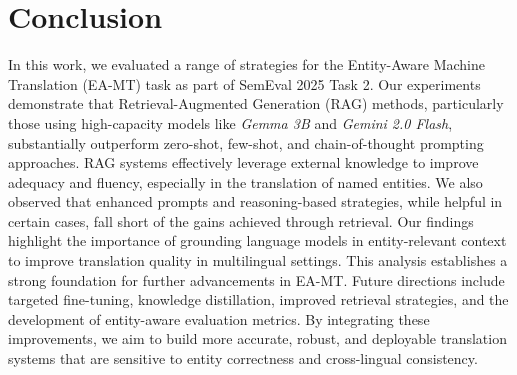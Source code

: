 \documentclass{ecai}
\begin{document}
\section{Conclusion}
\label{sec:conclusion}
In this work, we evaluated a range of strategies for the Entity-Aware Machine Translation (EA-MT) 
task as part of SemEval 2025 Task 2. Our experiments demonstrate that Retrieval-Augmented 
Generation (RAG) methods, particularly those using high-capacity models like \textit{Gemma 3B} 
and \textit{Gemini 2.0 Flash}, substantially outperform zero-shot, few-shot, and chain-of-thought 
prompting approaches. RAG systems effectively leverage external knowledge to improve adequacy and 
fluency, especially in the translation of named entities.
We also observed that enhanced prompts and reasoning-based strategies, while helpful in certain 
cases, fall short of the gains achieved through retrieval. Our findings highlight the importance
of grounding language models in entity-relevant context to improve translation quality in 
multilingual settings.
This analysis establishes a strong foundation for further advancements in EA-MT. 
Future directions include targeted fine-tuning, knowledge distillation, improved retrieval 
strategies, and the development of entity-aware evaluation metrics. By integrating these 
improvements, we aim to build more accurate, robust, and deployable translation systems that 
are sensitive to entity correctness and cross-lingual consistency.



\end{document}

